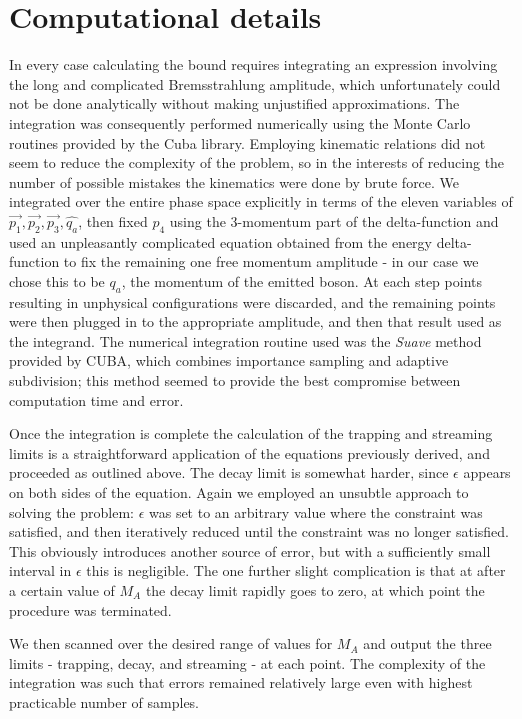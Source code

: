 \documentclass[nofootinbib,aps,prd,preprint,superscriptaddress]{revtex4}
\begin{document}
	
	
\section{Computational details}
In every case calculating the bound requires integrating an expression involving the long and complicated Bremsstrahlung amplitude, which unfortunately could not be done analytically without making unjustified approximations. The integration was consequently performed numerically using the Monte Carlo routines provided by the Cuba library. Employing kinematic relations did not seem to reduce the complexity of the problem, so in the interests of reducing the number of possible mistakes the kinematics were done by brute force. We integrated over the entire phase space explicitly in terms of the eleven variables of $ \vec{p_1}, \vec{p_2}, \vec{p_3}, \hat{q_a} $, then fixed $ p_4 $ using the 3-momentum part of the delta-function and used an unpleasantly complicated equation obtained from the energy delta-function to fix the remaining one free momentum amplitude - in our case we chose this to be $ q_a $, the momentum of the emitted boson. At each step points resulting in unphysical configurations were discarded, and the remaining points were then plugged in to the appropriate amplitude, and then that result used as the integrand. The numerical integration routine used was the \textit{Suave} method provided by CUBA, which combines importance sampling and adaptive subdivision; this method seemed to provide the best compromise between computation time and error. 
	
Once the integration is complete the calculation of the trapping and streaming limits is a straightforward application of the equations previously derived, and proceeded as outlined above. The decay limit is somewhat harder, since $ \epsilon $ appears on both sides of the equation. Again we employed an unsubtle approach to solving the problem: $ \epsilon $ was set to an arbitrary value where the constraint was satisfied, and then iteratively reduced until the constraint was no longer satisfied. This obviously introduces another source of error, but with a sufficiently small interval in $ \epsilon $ this is negligible. The one further slight complication is that at after a certain value of $ M_A $ the decay limit rapidly goes to zero, at which point the procedure was terminated.
	
We then scanned over the desired range of values for $ M_A $ and output the three limits - trapping, decay, and streaming - at each point. The complexity of the integration was such that errors remained relatively large even with highest practicable number of samples.
\end{document}
